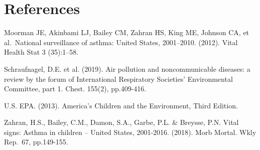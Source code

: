 \documentclass[12pt,]{article}
\begin{document}
\newpage

\hypertarget{references}{%
\section{References}\label{references}}

Moorman JE, Akinbami LJ, Bailey CM, Zahran HS, King ME, Johnson CA, et
al.~National surveillance of asthma: United States, 2001--2010. (2012).
Vital Health Stat 3 (35):1--58.

Schraufnagel, D.E. et al. (2019). Air pollution and noncommunicable
diseases: a review by the forum of International Respiratory Societies'
Environmental Committee, part 1. Chest. 155(2), pp.409-416.

U.S. EPA. (2013). America's Children and the Environment, Third Edition.

Zahran, H.S., Bailey, C.M., Damon, S.A., Garbe, P.L. \& Breysse, P.N.
Vital signs: Asthma in children -- United States, 2001-2016. (2018).
Morb Mortal. Wkly Rep.~67, pp.149-155.
\end{document}
